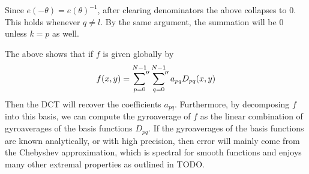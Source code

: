 Since $e(-\theta) = e(\theta)^{-1}$, after clearing denominators the above collapses to 0.  This holds whenever $q \neq l$.  By the same argument, the summation will be $0$ unless $k=p$ as well.   

The above shows that if $f$ is given globally by 
\[ f(x,y)= \sideset{}{''}\sum_{p=0}^{N-1} \sideset{}{''}\sum_{q=0}^{N-1} a_{pq}  D_{pq}(x,y)\]
Then the DCT will recover the coefficients $a_{pq}$.  Furthermore, by decomposing $f$ into this basis, we can compute the gyroaverage of $f$ as the linear combination of gyroaverages of the basis functions $D_{pq}$.  If the gyroaverages of the basis functions are known analytically, or with high precision, then error will mainly come from the Chebyshev approximation, which is spectral for smooth functions and enjoys many other extremal properties as outlined in TODO.
